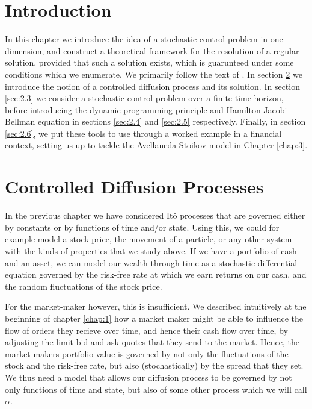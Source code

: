 \section{Introduction}
In this chapter we introduce the idea of a stochastic control problem in one dimension, 
and construct a theoretical framework for the resolution of a regular solution, 
provided that such a solution exists, which is guarunteed under some conditions which
we enumerate. We primarily follow the text of \cite{Pham}. In section \ref{sec:2.2} 
we introduce the notion of a controlled diffusion process and its solution. In section 
\ref{sec:2.3} we consider a stochastic control problem over a finite time horizon, 
before introducing the dynamic programming principle and Hamilton-Jacobi-Bellman 
equation in sections \ref{sec:2.4} and \ref{sec:2.5} respectively. Finally, in section 
\ref{sec:2.6}, we put these tools to use through a worked example in a financial 
context, setting us up to tackle the Avellaneda-Stoikov model in Chapter \ref{chap:3}.

\section{Controlled Diffusion Processes}\label{sec:2.2}

In the previous chapter we have considered It\^{o} processes that are governed either by constants or by
functions of time and/or state. Using this, we could for example model a stock price, the movement of a particle,
or any other system with the kinds of properties that we study above. If we have a portfolio of cash 
and an asset, we can model our wealth through time as a stochastic differential equation governed by the 
risk-free rate at which we earn returns on our cash, and the random fluctuations of the stock price. 

For the market-maker however, this is insufficient. We described intuitively at the beginning of chapter \ref{chap:1}
how a market maker might be able to influence the flow of orders they recieve over time, and hence their 
cash flow over time, by adjusting the limit bid and ask quotes that they send to the market. Hence,
the market makers portfolio value is governed by not only the fluctuations of the stock and the risk-free
rate, but also (stochastically) by the spread that they set. We thus need a model that allows our diffusion
process to be governed by not only functions of time and state, but also of some other process which we 
will call $\alpha$.

